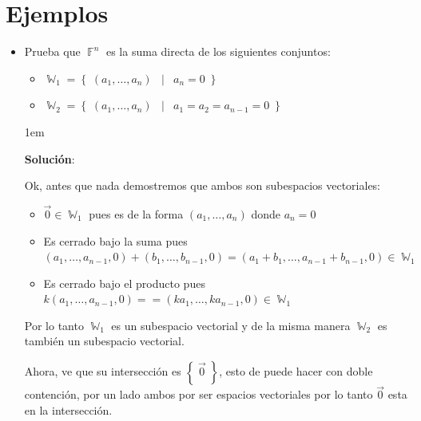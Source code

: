 \documentclass[12pt, fleqn]{report}                             %
\newenvironment{SmallIndentation}[1][0.75em]                    %
        {\begin{adjustwidth}{#1}{}\begin{footnotesize}}             %
        {\end{footnotesize}\end{adjustwidth}}                       %
\DeclareMathOperator \Space {\quad}                             %
\DeclareMathOperator \MiniSpace {\;}                            %
\newcommand \Such {\MiniSpace | \MiniSpace}                     %
\theoremstyle{break}                                            %
\DeclareMathOperator \GenericField {\mathbb{F}}                 %
\DeclareMathOperator \SubVectorSet {\mathbb{W}}                 %
\newcommand{\Set}[1]    {\left\{ \; #1 \; \right\}}             %
\begin{document}
        \section{Ejemplos}

            \begin{itemize}
                
                \item 
                    Prueba que $\GenericField^n$ es la suma directa de los siguientes
                    conjuntos:
                    \begin{itemize}
                        \item $\SubVectorSet_1 = \Set{(a_1, \dots, a_n) \Such a_n = 0}$
                        \item $\SubVectorSet_2 = \Set{(a_1, \dots, a_n) \Such a_1 = a_2 = a_{n-1} = 0}$
                    \end{itemize}


                    \begin{SmallIndentation}[1em]
                        \textbf{Solución}:

                        Ok, antes que nada demostremos que ambos son subespacios vectoriales:
                        \begin{itemize}
                            \item $\vec 0 \in \SubVectorSet_1$ pues es de la forma $(a_1, \dots, a_n)$ donde
                                $a_n = 0$
                            \item Es cerrado bajo la suma pues
                                $(a_1, \dots, a_{n-1}, 0) + (b_1, \dots, b_{n-1}, 0) 
                                    = (a_1+b_1, \dots, a_{n-1}+b_{n-1}, 0)
                                    \in \SubVectorSet_1$

                            \item Es cerrado bajo el producto pues
                                $k(a_1, \dots, a_{n-1}, 0) = = (ka_1, \dots, ka_{n-1}, 0)
                                    \in \SubVectorSet_1$
                        \end{itemize}

                        Por lo tanto $\SubVectorSet_1$ es un subespacio vectorial y de la misma
                        manera $\SubVectorSet_2$ es también un subespacio vectorial.

                        Ahora, ve que su intersección es $\Set{\vec 0}$, esto de puede hacer
                        con doble contención, por un lado ambos por ser espacios vectoriales
                        por lo tanto $\vec 0$ esta en la intersección.


\end{SmallIndentation}
\end{itemize}
\end{document}
